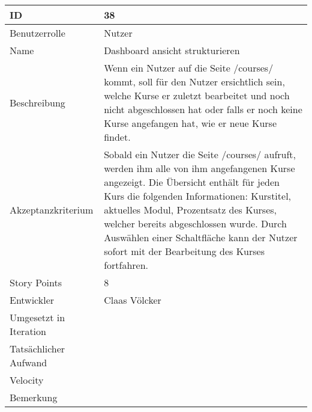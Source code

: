 \begin{tabularx}{\textwidth}{|p{}|X|}
	\hline
	ID & 38 \\
	\hline
	Benutzerrolle & Nutzer \\
	\hline
	Name & Dashboard ansicht strukturieren\\
	\hline
	Beschreibung & Wenn ein Nutzer auf die Seite /courses/ kommt, soll für den Nutzer ersichtlich sein, welche Kurse er zuletzt bearbeitet und noch nicht abgeschlossen hat oder falls er noch keine Kurse angefangen hat, wie er neue Kurse findet.  \\
	\hline
	Akzeptanzkriterium & Sobald ein Nutzer die Seite /courses/ aufruft, werden ihm alle von ihm angefangenen Kurse angezeigt. Die Übersicht enthält für jeden Kurs die folgenden Informationen: Kurstitel, aktuelles Modul, Prozentsatz des Kurses, welcher bereits abgeschlossen wurde. Durch Auswählen einer Schaltfläche kann der Nutzer sofort mit der Bearbeitung des Kurses fortfahren. \\
	\hline
	Story Points & 8\\
	\hline
	Entwickler & Claas Völcker\\
	\hline
	Umgesetzt in Iteration & \\
	\hline
	Tatsächlicher Aufwand & \\
	\hline
	Velocity & \\
	\hline
	Bemerkung & \\
	\hline
\end{tabularx}
\vspace{20pt}
